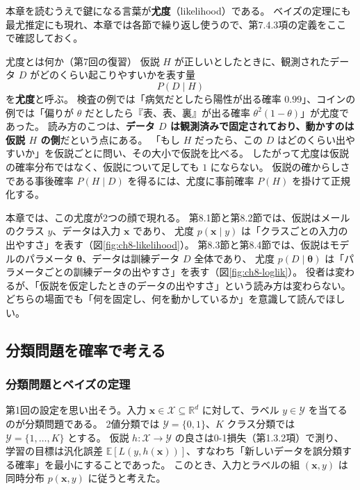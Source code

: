 本章を読むうえで鍵になる言葉が\textbf{尤度}（likelihood）である。
ベイズの定理にも最尤推定にも現れ、本章では各節で繰り返し使うので、第7.4.3項の定義をここで確認しておく。

\begin{itembox}[l]{尤度とは何か（第7回の復習）}
仮説 $H$ が正しいとしたときに、観測されたデータ $D$ がどのくらい起こりやすいかを表す量
\begin{equation*}
  P(D \mid H)
\end{equation*}
を\textbf{尤度}と呼ぶ。
検査の例では「病気だとしたら陽性が出る確率 $0.99$」、コインの例では「偏りが $\theta$ だとしたら『表、表、裏』が出る確率 $\theta^2(1 - \theta)$」が尤度であった。
読み方のこつは、\textbf{データ $D$ は観測済みで固定されており、動かすのは仮説 $H$ の側}だという点にある。
「もし $H$ だったら、この $D$ はどのくらい出やすいか」を仮説ごとに問い、その大小で仮説を比べる。
したがって尤度は仮説の確率分布ではなく、仮説について足しても $1$ にならない。
仮説の確からしさである事後確率 $P(H \mid D)$ を得るには、尤度に事前確率 $P(H)$ を掛けて正規化する。
\end{itembox}

本章では、この尤度が2つの顔で現れる。
第8.1節と第8.2節では、仮説はメールのクラス $y$、データは入力 $\bm{x}$ であり、
尤度 $p(\bm{x} \mid y)$ は「クラスごとの入力の出やすさ」を表す（図\ref{fig:ch8-likelihood}）。
第8.3節と第8.4節では、仮説はモデルのパラメータ $\bm{\theta}$、データは訓練データ $D$ 全体であり、
尤度 $p(D \mid \bm{\theta})$ は「パラメータごとの訓練データの出やすさ」を表す（図\ref{fig:ch8-loglik}）。
役者は変わるが、「仮説を仮定したときのデータの出やすさ」という読み方は変わらない。
どちらの場面でも「何を固定し、何を動かしているか」を意識して読んでほしい。


\subsection{分類問題を確率で考える}

\subsubsection{分類問題とベイズの定理}

第1回の設定を思い出そう。入力 $\bm{x} \in \mathcal{X} \subseteq \mathbb{R}^d$ に対して、ラベル $y \in \mathcal{Y}$ を当てるのが分類問題である。
2値分類では $\mathcal{Y} = \{0, 1\}$、$K$ クラス分類では $\mathcal{Y} = \{1, \ldots, K\}$ とする。
仮説 $h : \mathcal{X} \to \mathcal{Y}$ の良さは0-1損失（第1.3.2項）で測り、
学習の目標は汎化誤差 $\mathbb{E}[L(y, h(\bm{x}))]$、すなわち「新しいデータを誤分類する確率」を最小にすることであった。
このとき、入力とラベルの組 $(\bm{x}, y)$ は同時分布 $p(\bm{x}, y)$ に従うと考えた。

